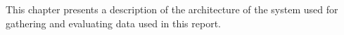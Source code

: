This chapter presents a description of the architecture of the system used for gathering and evaluating data used in this report.